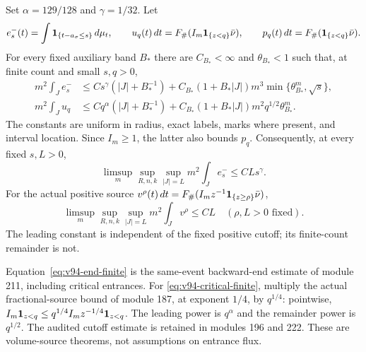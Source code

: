 \begin{inputstatement}
\label{input:v94-volume}
Set $\alpha=129/128$ and $\gamma=1/32$. Let
\[
 e_s^-(t)=\int\mathbf1_{\{t-a_\sigma\le s\}}\,d\mu_t,\qquad
 u_q(t)\,dt=F_\#(I_m\mathbf1_{\{z<q\}}\bar\nu),\qquad
 p_q(t)\,dt=F_\#(\mathbf1_{\{z<q\}}\bar\nu).
\]
For every fixed auxiliary band $B_*$ there are $C_{B_*}<\infty$ and
$\theta_{B_*}<1$ such that, at finite count and small $s,q>0$,
\begin{align}
 m^2\int_J e_s^-&\le C s^\gamma(|J|+B_*^{-1})
 +C_{B_*}(1+B_*|J|)m^3\min\{\theta_{B_*}^m,\sqrt s\},
                                            \label{eq:v94-end-finite}\\
 m^2\int_J u_q&\le C q^\alpha(|J|+B_*^{-1})
 +C_{B_*}(1+B_*|J|)m^2q^{1/2}\theta_{B_*}^m.
                                            \label{eq:v94-critical-finite}
\end{align}
The constants are uniform in radius, exact labels, marks where present,
and interval location. Since $I_m\ge1$, the latter also bounds $p_q$.
Consequently, at every fixed $s,L>0$,
\[
 \limsup_m\sup_{R,n,k}\sup_{|J|=L}m^2\int_J e_s^-\le CLs^\gamma.
\]
For the actual positive source
$v^\rho(t)\,dt=F_\#(I_m z^{-1}\mathbf1_{\{z\ge\rho\}}\bar\nu)$,
\begin{equation}\label{eq:v94-cutoff}
 \limsup_m\sup_{R,n,k}\sup_{|J|=L}m^2\int_J v^\rho\le C L
                  \quad(\rho,L>0\text{ fixed}).
\end{equation}
The leading constant is independent of the fixed positive cutoff;
its finite-count remainder is not.
\end{inputstatement}
Equation~\eqref{eq:v94-end-finite} is the same-event backward-end
estimate of module 211, including critical entrances. For
\eqref{eq:v94-critical-finite}, multiply the actual fractional-source
bound of module 187, at exponent $1/4$, by $q^{1/4}$: pointwise,
$I_m\mathbf1_{z<q}\le q^{1/4}I_mz^{-1/4}\mathbf1_{z<q}$.
The leading power is $q^\alpha$ and the remainder power is $q^{1/2}$.
The audited cutoff estimate is retained in modules 196 and 222.
These are volume-source theorems, not assumptions on entrance flux.

